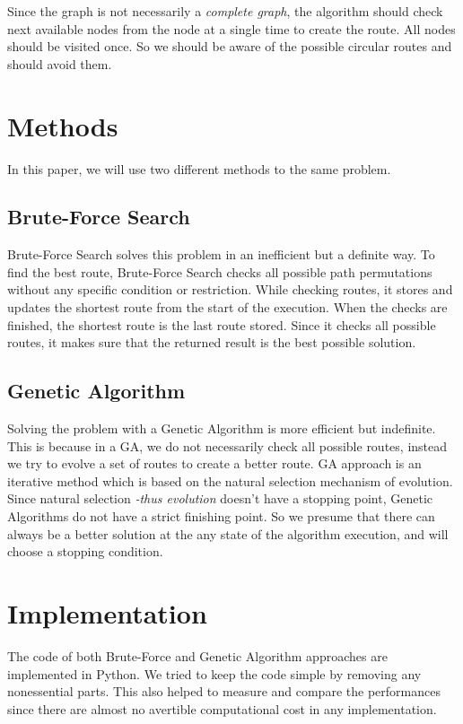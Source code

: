 \documentclass[journal,transmag]{IEEEtran}
\begin{document}
    Since the graph is not necessarily a \textit{complete graph}, the algorithm
    should check next available nodes from the node at a single time to create
    the route. All nodes should be visited once. So we should be aware of the
    possible circular routes and should avoid them.

    \section{Methods}
    In this paper, we will use two different methods to the same problem.

    \subsection{Brute-Force Search}
    Brute-Force Search solves this problem in an inefficient but a definite way.
    To find the best route, Brute-Force Search checks all possible path
    permutations without any specific condition or restriction. While checking
    routes, it stores and updates the shortest route from the start of the
    execution. When the checks are finished, the shortest route is the last
    route stored. Since it checks all possible routes, it makes sure that the
    returned result is the best possible solution.

    \subsection{Genetic Algorithm}
    Solving the problem with a Genetic Algorithm is more efficient but
    indefinite. This is because in a GA, we do not necessarily check all
    possible routes, instead we try to evolve a set of routes to create a better
    route. GA approach is an iterative method which is based on the natural
    selection mechanism of evolution. Since natural selection \textit{-thus
    evolution} doesn't have a stopping point, Genetic Algorithms do not have a
    strict finishing point. So we presume that there can always be a better
    solution at the any state of the algorithm execution, and will choose a
    stopping condition.


    \section{Implementation}
    The code \cite{code_repository} of both Brute-Force and Genetic Algorithm
    approaches are implemented in Python. We tried to keep the code simple by
    removing any nonessential parts. This also helped to measure and compare the
    performances since there are almost no avertible computational cost in any
    implementation.
\end{document}
